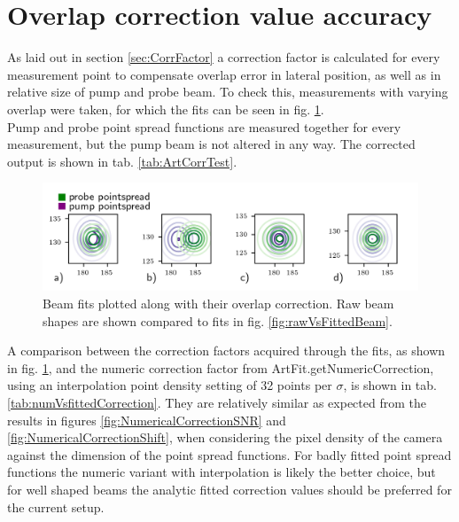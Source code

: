 \documentclass[twoside,openright,listof=numbered]{scrreprt}
\begin{document}
\section{Overlap correction value accuracy}
As laid out in section \ref{sec:CorrFactor} a correction factor is calculated for every measurement point to compensate overlap error in lateral position, as well as in relative size of pump and probe beam.
To check this, measurements with varying overlap were taken, for which the fits can be seen in fig. \ref{fig:correctionComparison}.\\
Pump and probe point spread functions are measured together for every measurement, but the pump beam is not altered in any way. The corrected output is shown in tab. \ref{tab:ArtCorrTest}.\\

\begin{figure}[H]
\centering
\includegraphics[width=\linewidth]{images/CompensationTestFitted.png}
\caption[Beam fits for overlap correction testing plotted along with their overlap correction.]{Beam fits plotted along with their overlap correction. Raw beam shapes are shown compared to fits in fig. \ref{fig:rawVsFittedBeam}.\label{fig:correctionComparison}}
\end{figure}

A comparison between the correction factors acquired through the fits, as shown in fig. \ref{fig:correctionComparison}, and the numeric correction factor from ArtFit.getNumericCorrection, using an interpolation point density setting of 32 points per $\sigma$, is shown in tab. \ref{tab:numVsfittedCorrection}. They are relatively similar as expected from the results in figures \ref{fig:NumericalCorrectionSNR} and \ref{fig:NumericalCorrectionShift}, when considering the pixel density of the camera against the dimension of the point spread functions. For badly fitted point spread functions the numeric variant with interpolation is likely the better choice, but for well shaped beams the analytic fitted correction values should be preferred for the current setup.
\end{document}

